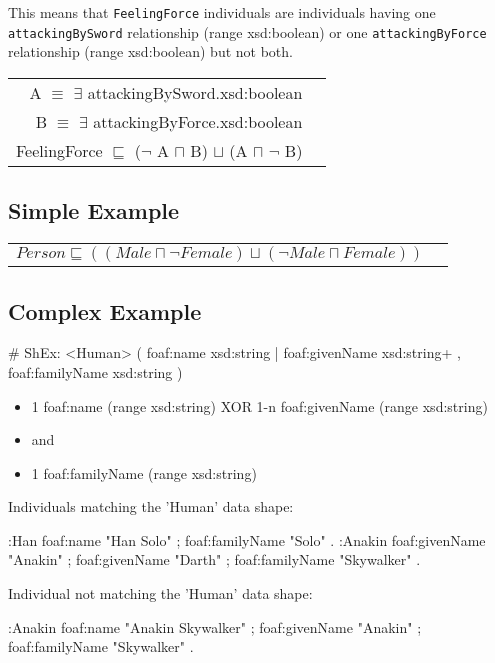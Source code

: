\documentclass{llncs}
\newcommand{\ms}[1]{\texttt{#1}}
\newenvironment{DL}{
  \vspace{0cm}
	\begin{center}
  \begin{tabular}{r l}

}{
  \end{tabular}
	\end{center}
}
\begin{document}
This means that \ms{FeelingForce} individuals are individuals having one \\
\ms{attackingBySword} relationship (range xsd:boolean) or one \ms{attackingByForce} relationship (range xsd:boolean) but not both.

\begin{DL}
A $\equiv$ $\exists$ attackingBySword.xsd:boolean \\
B $\equiv$ $\exists$ attackingByForce.xsd:boolean \\ 
FeelingForce $\sqsubseteq$ ($\neg$ A $\sqcap$ B) $\sqcup$ (A $\sqcap$ $\neg$ B) \\
\end{DL}

\subsection{Simple Example}

\begin{DL}
$Person \sqsubseteq ((Male \sqcap \neg Female) \sqcup (\neg Male \sqcap  Female)) $ 
\end{DL}

\subsection{Complex Example}

\begin{ex}
# ShEx:
<Human> { (  
    foaf:name xsd:string | foaf:givenName xsd:string+ , 
    foaf:familyName xsd:string ) }
\end{ex}

\begin{itemize}
	\item 1 foaf:name (range xsd:string) XOR 1-n foaf:givenName (range xsd:string)
	\item and
	\item 1 foaf:familyName (range xsd:string)
\end{itemize}

Individuals matching the 'Human' data shape:

\begin{ex}
:Han
    foaf:name "Han Solo" ;
    foaf:familyName "Solo" .
:Anakin
    foaf:givenName "Anakin" ;
    foaf:givenName "Darth" ;
    foaf:familyName "Skywalker" .
\end{ex}

Individual not matching the 'Human' data shape:

\begin{ex}
:Anakin
    foaf:name "Anakin Skywalker" ;
    foaf:givenName "Anakin" ;
    foaf:familyName "Skywalker" .
\end{ex}
\end{document}
